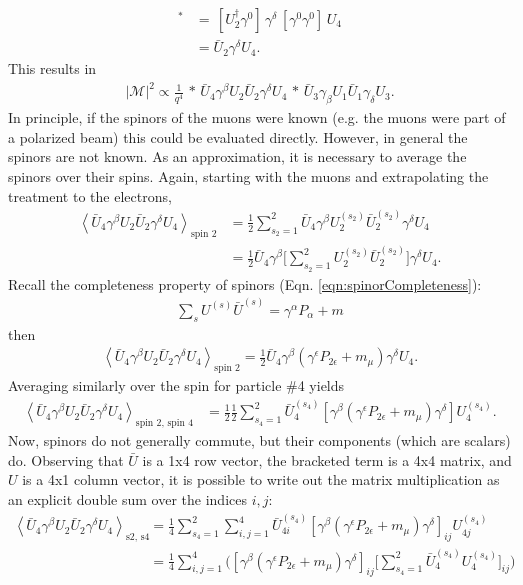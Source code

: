 \begin{align*}
[\bar{U}_4\gamma^\delta U_2]^*&=\,[U^\dagger _2 \gamma^0] \, \gamma^\delta \, [\gamma^0 \gamma^0] \, U_4\\
&=\bar{U}_2 \gamma^\delta U_4.
\end{align*}
This results in
\begin{align} \label{eqn:mottIntermediate}
|\mathcal{M}|^2 \propto \frac{1}{q^4} \, * \, \bar{U}_4\gamma^\beta U_2 \bar{U}_2 \gamma^\delta U_4 \, * \, \bar{U}_3\gamma_\beta U_1 \bar{U}_1 \gamma_\delta U_3.
\end{align}
In principle, if the spinors of the muons were known (e.g. the muons were part of a polarized beam) this could be evaluated directly. However, in general the spinors are not known. As an approximation, it is necessary to average the spinors over their spins. Again, starting with the muons and extrapolating the treatment to the electrons,
\begin{align*}
\left< \bar{U}_4 \gamma^\beta U_2 \bar{U}_2 \gamma^\delta U_4 \right> _\text{spin 2}
&= \frac{1}{2} \sum _{s_2 = 1} ^2 \bar{U}_4 \gamma^\beta U_2 ^{(s_2)} \bar{U}_2 ^{(s_2)} \gamma^\delta U_4\\
&= \frac{1}{2} \bar{U}_4 \gamma^\beta \big[ \sum _{s_2 = 1} ^2 U_2 ^{(s_2)} \bar{U}_2 ^{(s_2)} \big] \gamma^\delta U_4.
\end{align*}
Recall the completeness property of spinors (Eqn. \ref{eqn:spinorCompleteness}):
\begin{align*}
\sum _s U^{(s)}\bar{U}^{(s)} = \gamma^\alpha P_\alpha + m
\end{align*}
then
\begin{align*}
\left< \bar{U}_4 \gamma^\beta U_2 \bar{U}_2 \gamma^\delta U_4 \right> _\text{spin 2}
= \frac{1}{2} \bar{U}_4 \gamma^\beta (\gamma^\epsilon P_{2\epsilon}+m_\mu)\gamma^\delta U_4.
\end{align*}
Averaging similarly over the spin for particle \#4 yields
\begin{align*}
\left< \bar{U}_4 \gamma^\beta U_2 \bar{U}_2 \gamma^\delta U_4 \right> _\text{spin 2, spin 4}
&= \frac{1}{2} \frac{1}{2} \sum_{s_4=1} ^2 \bar{U}_4 ^{(s_4)} [\gamma^\beta (\gamma^\epsilon P_{2\epsilon}+m_\mu)\gamma^\delta] U_4 ^{(s_4)}.
\end{align*}
Now, spinors do not generally commute, but their components (which are scalars) do. Observing that $\bar{U}$ is a 1x4 row vector, the bracketed term is a 4x4 matrix, and $U$ is a 4x1 column vector, it is possible to write out the matrix multiplication as an explicit double sum over the indices $i,j$:
\begin{align*}
\left< \bar{U}_4 \gamma^\beta U_2 \bar{U}_2 \gamma^\delta U_4 \right> _\text{s2, s4}
&=\frac{1}{4}\sum_{s_4=1} ^2 \sum_{i,j=1} ^4 \bar{U}_{4i} ^{(s_4)} [\gamma^\beta(\gamma^\epsilon P_{2\epsilon}+m_\mu)\gamma^\delta]_{ij} U_{4j} ^{(s_4)}\\
&=\frac{1}{4}\sum_{i,j=1} ^4 \Big([\gamma^\beta(\gamma^\epsilon P_{2\epsilon}+m_\mu)\gamma^\delta]_{ij} \Big[ \sum_{s_4=1} ^2 \bar{U}_4 ^{(s_4)} U_4 ^{(s_4)}\Big]_{ij} \Big)
\end{align*}

